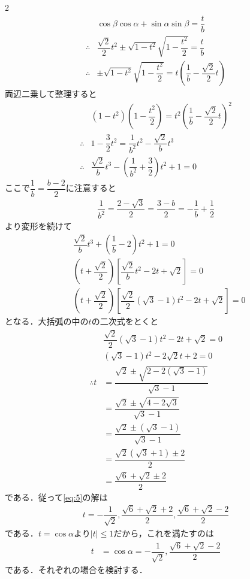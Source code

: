 \documentclass[../../main.tex]{subfiles}
\begin{document}
\begin{multicols}{2}
\begin{align}
    & \cos\beta\cos\alpha + \sin\alpha\sin\beta = \dfrac{t}{b}             \nonumber                              \\
    \therefore & \dfrac{\sqrt{2}}{2} t^2 \pm \sqrt{1-t^2} \sqrt{1-\dfrac{t^2}{2}} = \dfrac{t}{b} \nonumber                     \\
    \therefore & \pm \sqrt{1-t^2}\sqrt{1-\dfrac{t^2}{2}} = t\left(\dfrac{1}{b}-\dfrac{\sqrt{2}}{2}t\right) \label{eq:4}
  \end{align}
  両辺二乗して整理すると
  \begin{align}
    & \left(1-t^2\right)\left(1-\dfrac{t^2}{2}\right) = t^2\left(\dfrac{1}{b}-\dfrac{\sqrt{2}}{2}t\right)^2 \\
    \therefore & 1-\dfrac{3}{2}t^2 = \dfrac{1}{b^2}t^2-\dfrac{\sqrt{2}}{b}t^3                                          \\
    \therefore & \dfrac{\sqrt{2}}{b}t^3  - \left(\dfrac{1}{b^2}+\dfrac{3}{2}\right)t^2 +1 = 0
  \end{align}
  ここで$\dfrac{1}{b}=\dfrac{b-2}{2}$に注意すると
  \begin{align}
    \dfrac{1}{b^2} = \dfrac{2-\sqrt{3}}{2} = \dfrac{3-b}{2} = -\dfrac{1}{b} + \dfrac{1}{2}
  \end{align}
  より変形を続けて
  \begin{align}
    & \dfrac{\sqrt{2}}{b}t^3 + \left(\dfrac{1}{b}-2\right)t^2 +1 = 0       \nonumber                                        \\
    & \left(t+\dfrac{\sqrt{2}}{2}\right)\left[\dfrac{\sqrt{2}}{b}t^2-2t+\sqrt{2}\right] = 0 \nonumber                       \\
    & \left(t+\dfrac{\sqrt{2}}{2}\right)\left[\dfrac{\sqrt{2}}{2}(\sqrt{3}-1)t^2-2t+\sqrt{2}\right] = 0 \label{eq:5}
  \end{align}
  となる．大括弧の中の$t$の二次式をとくと
  \begin{align}
    & \dfrac{\sqrt{2}}{2}(\sqrt{3}-1)t^2-2t+\sqrt{2} = 0 \\
    & (\sqrt{3}-1)t^2 - 2\sqrt{2} t + 2 = 0 \\
    \therefore
    t
    &= \dfrac{\sqrt{2} \pm \sqrt{2 - 2(\sqrt{3}-1)}}{\sqrt{3}-1} \\
    &= \dfrac{\sqrt{2} \pm \sqrt{4-2\sqrt{3}}}{\sqrt{3}-1} \\
    &= \dfrac{\sqrt{2} \pm (\sqrt{3}-1)}{\sqrt{3}-1} \\
    &= \dfrac{\sqrt{2}(\sqrt{3}+1) \pm 2}{2} \\
    &= \dfrac{\sqrt{6}+\sqrt{2} \pm 2}{2}
  \end{align}
  である．従って\cref{eq:5}の解は
  \begin{align}
    t = -\dfrac{1}{\sqrt{2}},\dfrac{\sqrt{6}+\sqrt{2}+2}{2}, \dfrac{\sqrt{6}+\sqrt{2}-2}{2}
  \end{align}
  である．$t=\cos\alpha$より$|t|\le 1$だから，これを満たすのは
  \begin{align}
    t &= \cos\alpha = -\dfrac{1}{\sqrt{2}},\dfrac{\sqrt{6}+\sqrt{2}-2}{2}
  \end{align}
  である．それぞれの場合を検討する．


\end{multicols}
\end{document}

